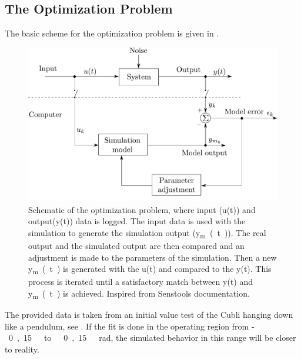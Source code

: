 \subsection{The Optimization Problem}
The basic scheme for the optimization problem is given in .
%
\begin{figure}[H]
	\centering
	\includegraphics[scale=0.4]{figures/senstoolsModelOptimizationHM}
%	
	\caption{Schematic of the optimization problem, where input (u(t)) and output(y(t)) data is logged. The input data is used with the simulation to generate the simulation output (\si{y_{m}(t)}). The real output and the simulated output are then compared and an adjustment is made to the parameters of the simulation. Then a new \si{y_{m}(t)} is generated with the u(t) and compared to the y(t). This process is iterated until a satisfactory match between y(t) and \si{y_{m}(t)} is achieved. Inspired from Senstools documentation.\cite{Senstools}}
	\label{SensToolSchema}
\end{figure}\vspace{-18pt}
The provided data is taken from an initial value test of the Cubli hanging down like a pendulum, see .
If the fit is done in the operating region from \si{-0,15\ to\ 0,15\ rad}, the simulated behavior in this range will be closer to reality.

